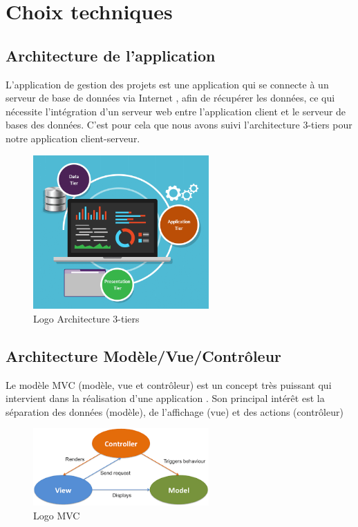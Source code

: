 \documentclass[a4paper,10pt]{book}
\begin{document}
\section{Choix techniques }
\subsection{ Architecture de l’application}
\par
      L’application de gestion des projets est une application qui se connecte à un serveur de base de données via Internet \cite{3tiers}, afin de récupérer les données, ce qui nécessite l’intégration d’un serveur web entre l’application client et le serveur de bases des données. C’est pour cela que nous avons suivi l’architecture 3-tiers pour notre application client-serveur. 
      
\vspace{3cm}
\begin{figure}[!h]
\centering 
\includegraphics[width=0.6\textwidth]{3-tier_architecture-2.png}
\caption{Logo  Architecture 3-tiers  }
\end{figure}

\vspace{1cm}
\subsection{Architecture Modèle/Vue/Contrôleur }
\par   Le modèle MVC (modèle, vue et contrôleur) est un concept très puissant qui intervient dans la réalisation d’une application \cite{mvc}. Son principal intérêt est la séparation des données (modèle), de l’affichage (vue) et des actions (contrôleur)
      \begin{figure}[!h]
\centering 
\includegraphics[width=0.6\textwidth]{mvc.png}
\caption{Logo MVC }
\end{figure}
\end{document}
